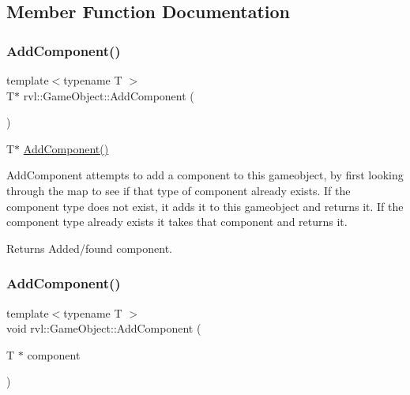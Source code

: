 \subsection{Member Function Documentation}
\mbox{\label{classrvl_1_1_game_object_a84757644ca964d0f24e003d35bec60a7}} 
\subsubsection{\texorpdfstring{Add\+Component()}{AddComponent()}\hspace{0.1cm}{\footnotesize\ttfamily [1/2]}}
{\footnotesize\ttfamily template$<$typename T $>$ \\
T$\ast$ rvl\+::\+Game\+Object\+::\+Add\+Component (\begin{DoxyParamCaption}{ }\end{DoxyParamCaption})\hspace{0.3cm}{\ttfamily [inline]}}



T$\ast$ \hyperlink{classrvl_1_1_game_object_a84757644ca964d0f24e003d35bec60a7}{Add\+Component()} 

Add\+Component attempts to add a component to this gameobject, by first looking through the map to see if that type of component already exists. If the component type does not exist, it adds it to this gameobject and returns it. If the component type already exists it takes that component and returns it.

\begin{DoxyReturn}{Returns}
Added/found component. 
\end{DoxyReturn}
\mbox{\label{classrvl_1_1_game_object_a4b91502ba7295337f55c832dea27cf67}} 
\subsubsection{\texorpdfstring{Add\+Component()}{AddComponent()}\hspace{0.1cm}{\footnotesize\ttfamily [2/2]}}
{\footnotesize\ttfamily template$<$typename T $>$ \\
void rvl\+::\+Game\+Object\+::\+Add\+Component (\begin{DoxyParamCaption}\item[{T $\ast$}]{component }\end{DoxyParamCaption})\hspace{0.3cm}{\ttfamily [inline]}}



